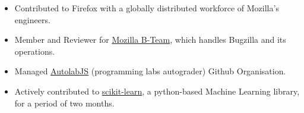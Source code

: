 %
%
%


\begin{courses}
	\course
	{\begin{itemize}
    \item Contributed to Firefox with a globally distributed workforce of Mozilla’s engineers.
    \item Member and Reviewer for \href{https://github.com/mozilla-bteam}{Mozilla B-Team}, which handles Bugzilla and its operations.
    \item Managed \href{https://github.com/AutolabJS}{AutolabJS} (programming labs autograder) Github Organisation.
    \item Actively contributed to \href{https://github.com/scikit-learn/scikit-learn/commits?author=SebastinSanty}{scikit-learn}, a python-based Machine Learning library, for a period of two months.
     \end{itemize}}

\end{courses}
\vspace{-3mm}